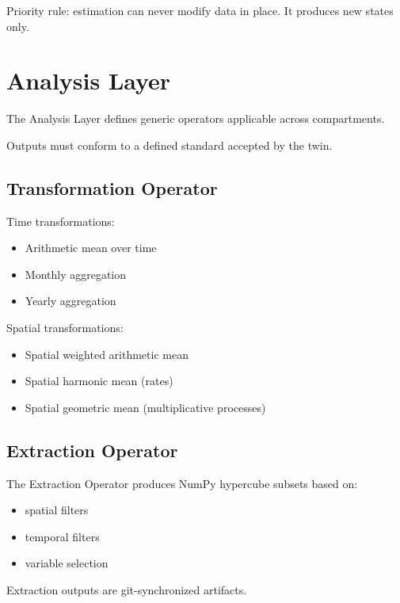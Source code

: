 Priority rule: estimation can never modify data in place. It produces new states only.


\section{Analysis Layer}
\label{ch:analysis-layer}

The Analysis Layer defines generic operators applicable across compartments.

Outputs must conform to a defined standard accepted by the twin.

\subsection{Transformation Operator}

Time transformations:

\begin{itemize}
\item Arithmetic mean over time
\item Monthly aggregation
\item Yearly aggregation
\end{itemize}

Spatial transformations:

\begin{itemize}
\item Spatial weighted arithmetic mean
\item Spatial harmonic mean (rates)
\item Spatial geometric mean (multiplicative processes)
\end{itemize}

\subsection{Extraction Operator}

The Extraction Operator produces NumPy hypercube subsets based on:

\begin{itemize}
\item spatial filters
\item temporal filters
\item variable selection
\end{itemize}

Extraction outputs are git-synchronized artifacts.


